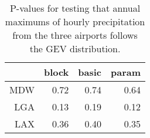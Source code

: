 \begin{table}[ht]
\centering
\caption{P-values for testing that annual maximums of hourly 
            precipitation from the three airports follows the GEV distribution.} 
\label{table:precipitation}
\begin{tabular}{rrrr}
  \hline
 & block & basic & param \\ 
  \hline
MDW & 0.72 & 0.74 & 0.64 \\ 
  LGA & 0.13 & 0.19 & 0.12 \\ 
  LAX & 0.36 & 0.40 & 0.35 \\ 
   \hline
\end{tabular}
\end{table}


